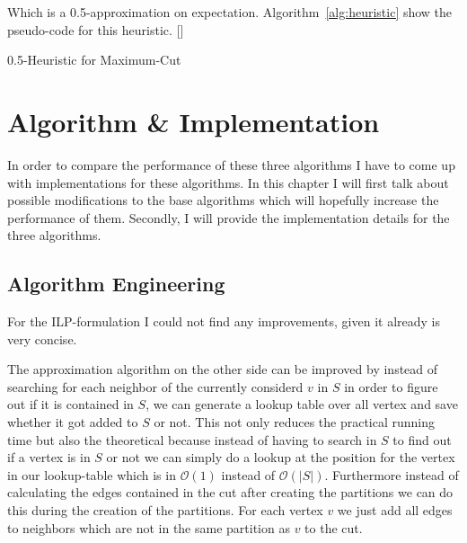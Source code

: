 \documentclass[twocolumn]{article}
\begin{document}
Which is a 0.5-approximation on expectation.
Algorithm~\ref{alg:heuristic} show the pseudo-code for this heuristic. [\cite{algorithms}]

\begin{algorithm}
  \caption{0.5-Heuristic for Maximum-Cut}
  \label{alg:heuristic}
\end{algorithm}


\section{Algorithm \& Implementation}
In order to compare the performance of these three algorithms I have to come up with implementations for these algorithms.
In this chapter I will first talk about possible modifications to the base algorithms which will hopefully increase the performance of them.
Secondly, I will provide the implementation details for the three algorithms.

\subsection{Algorithm Engineering}
For the ILP-formulation I could not find any improvements, given it already is very concise.

The approximation algorithm on the other side can be improved by instead of searching for each neighbor of the currently considerd $v$ in $S$
in order to figure out if it is contained in $S$, we can generate a lookup table over all vertex and save whether it got added to $S$ or not.
This not only reduces the practical running time but also the theoretical because instead of having to search in $S$ to find out if a vertex is
in $S$ or not we can simply do a lookup at the position for the vertex in our lookup-table which is in $\mathcal{O}(1)$ instead of $\mathcal{O}(|S|)$.
Furthermore instead of calculating the edges contained in the cut after creating the partitions we can do this during the creation of the partitions.
For each vertex $v$ we just add all edges to neighbors which are not in the same partition as $v$ to the cut.
\end{document}
